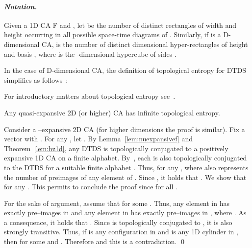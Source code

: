 \documentclass{llncs}
\begin{document}
\paragraph{\emph{Notation.}} Given a 1D CA F and
, let  be the number of distinct rectangles of width  and height  occurring in all possible space-time diagrams  
of . 
Similarly, if  is a D-dimensional CA,  is the
number of distinct  dimensional hyper-rectangles of
height  and basis , where 
 is the -dimensional hypercube of sides .

In the case of D-dimensional CA, the definition of topological entropy for DTDS simplifies as follows~\cite{hurd92,damico03}:

For introductory matters about topological entropy see~\cite{kurka04}.

\begin{theorem}\label{th:qe-infinite-tope}
Any quasi-expansive 2D (or higher) CA has infinite topological
entropy.
\end{theorem}
\proof
Consider a --expansive 2D CA (for higher dimensions the proof is similar).
Fix a vector  with . For any , let . 
By Lemma~\ref{lem:nuexpansivef} and Theorem~\ref{lem:bz1d}, any DTDS  is topologically conjugated to a positively expansive 1D CA on a finite alphabet. 
By~\cite[Thm. 3.12]{nasu95}, each  is also topologically conjugated to the DTDS  for a suitable finite alphabet . Thus, for any ,  where  also represents the number of preimages of any element of .
Since , it holds that . We show that  for any . This permits to conclude the proof since  for all . 

For the sake of argument, assume that  for some . Thus, any element in  has exactly  pre--images in  and any element in  has exactly  pre--images in , where . As a consequence, it holds that .  Since  is topologically conjugated to , it is also strongly transitive. 
Thus, if  is any configuration in  and  is any 1D cylinder in , then  for some  and . Therefore  and this is a contradiction. 
\qed
\end{document}
